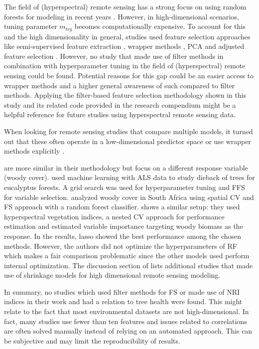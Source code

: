 \documentclass[letterpaper, peerreview, draftcls]{IEEEtran}
\begin{document}
The field of (hyperspectral) remote sensing has a strong focus on using random forests for modeling in recent years \cite{belgiu2016}.
However, in high-dimensional scenarios, tuning parameter \texttt{\(m_{try}\)} becomes computationally expensive.
To account for this and the high dimensionality in general, studies used feature selection approaches like semi-supervised feature extraction \cite{xia2015}, wrapper methods \cite{fassnacht2014, feng2016, georganos2018}, PCA and adjusted feature selection \cite{rochac2016}.
However, no study that made use of filter methods in combination with hyperparameter tuning in the field of (hyperspectral) remote sensing could be found.
Potential reasons for this gap could be an easier access to wrapper methods and a higher general awareness of such compared to filter methods.
Applying the filter-based feature selection methodology shown in this study and its related code provided in the research compendium might be a helpful reference for future studies using hyperspectral remote sensing data.

When looking for remote sensing studies that compare multiple models, it turned out that these often operate in a low-dimensional predictor space \cite{xu2019} or use wrapper methods explicitly \cite{georganos2018}.

\cite{shendryk2016, ludwig2019} are more similar in their methodology but focus on a different response variable (woody cover).
\cite{shendryk2016} used machine learning with \ac{ALS} data to study dieback of trees for eucalyptus forests.
A grid search was used for hyperparameter tuning and \ac{FFS} for variable selection.
\cite{ludwig2019} analyzed woody cover in South Africa using spatial \ac{CV} and \ac{FS} approach \cite{meyer2018} with a random forest classifier.
\cite{zandler2015} shows a similar setup: they used hyperspectral vegetation indices, a nested CV approach for performance estimation and estimated variable importance targeting woody biomass as the response.
In the results, lasso showed the best performance among the chosen methods.
However, the authors did not optimize the hyperparameters of RF which makes a fair comparison problematic since the other models used perform internal optimization.
The discussion section of \cite{zandler2015} lists additional studies that made use of shrinkage models for high dimensional remote sensing modeling.

In summary, no studies which used filter methods for \ac{FS} or made use of \ac{NRI} indices in their work and had a relation to tree health were found.
This might relate to the fact that most environmental datasets are not high-dimensional.
In fact, many studies use fewer than ten features and issues related to correlations are often solved manually instead of relying on an automated approach.
This can be subjective and may limit the reproducibility of results.
\end{document}
